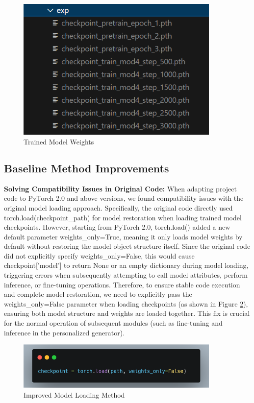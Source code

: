 \documentclass[10pt,a4paper]{article}
\begin{document}
\begin{figure}[H]
  \centering
  \includegraphics[width=10cm]{fig/model_weight.png}
  \caption{Trained Model Weights}\label{fig:model_weight}
\end{figure}

\subsection{Baseline Method Improvements}
\textbf{Solving Compatibility Issues in Original Code:}
When adapting project code to PyTorch 2.0 and above versions, we found compatibility issues with the original model loading approach. Specifically, the original code directly used torch.load(checkpoint\_path) for model restoration when loading trained model checkpoints. However, starting from PyTorch 2.0, torch.load() added a new default parameter weights\_only=True, meaning it only loads model weights by default without restoring the model object structure itself. Since the original code did not explicitly specify weights\_only=False, this would cause checkpoint['model'] to return None or an empty dictionary during model loading, triggering errors when subsequently attempting to call model attributes, perform inference, or fine-tuning operations. Therefore, to ensure stable code execution and complete model restoration, we need to explicitly pass the weights\_only=False parameter when loading checkpoints (as shown in Figure \ref{fig:model_loader}), ensuring both model structure and weights are loaded together. This fix is crucial for the normal operation of subsequent modules (such as fine-tuning and inference in the personalized generator).

\begin{figure}[H]
  \centering
  \includegraphics[width=10cm]{fig/load_new.png}
  \caption{Improved Model Loading Method}\label{fig:model_loader}
\end{figure}
\end{document}
